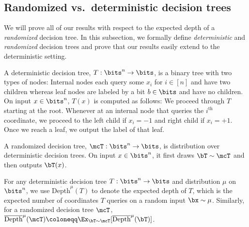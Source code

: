 \subsection{Randomized vs.~deterministic decision trees}
We will prove all of our results with respect to the expected depth of a \emph{randomized} decision tree. In this subsection, we formally define \emph{deterministic} and \emph{randomized} decision trees and prove that our results easily extend to the deterministic setting.

\begin{definition}
    A deterministic decision tree, $T: \bits^n \to \bits$, is a binary tree with two types of nodes: Internal nodes each query some $x_i$ for $i \in [n]$ and have two children whereas leaf nodes are labeled by a bit $b \in \bits$ and have no children. On input $x \in \bits^n$, $T(x)$ is computed as follows: We proceed through $T$ starting at the root. Whenever at an internal node that queries the $i^{\text{th}}$ coordinate, we proceed to the left child if $x_i = -1$ and right child if $x_i = +1$. Once we reach a leaf, we output the label of that leaf.
\end{definition}
\begin{definition}
    A randomized decision tree, $\mcT:\bits^n \to \bits$, is distribution over deterministic decision trees. On input $x \in \bits^n$, it first draws $\bT \sim \mcT$ and then outputs $\bT(x)$.
\end{definition}
\begin{definition}
    For any deterministic decision tree $T: \bits^n \to \bits$ and distribution $\mu$ on $\bits^n$, we use $\overline{\mathrm{Depth}}^{\mu}(T)$ to denote the expected depth of $T$, which is the expected number of coordinates $T$ queries on a random input $\bx \sim \mu$. Similarly, for a randomized decision tree $\mcT$, $\overline{\mathrm{Depth}}^{\mu}(\mcT) \coloneqq \Ex_{\bT \sim \mcT}[\overline{\mathrm{Depth}}^{\mu}(\bT)]$.
\end{definition}



